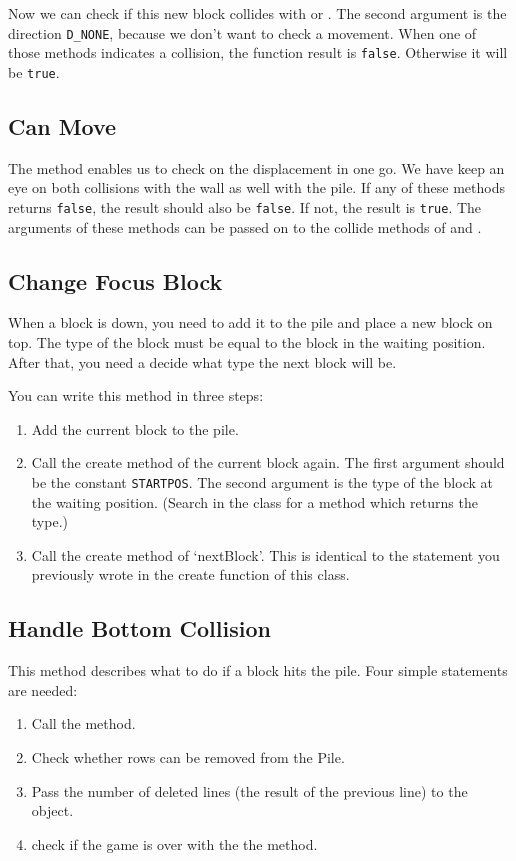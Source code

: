 Now we can check if this new block collides with  or . The second argument is the direction \verb|D_NONE|, because we don't want to check a movement. When one of those methods indicates a collision, the function result is \verb|false|. Otherwise it will be \verb|true|.

\subsection{Can Move}
The  method enables us to check on the displacement in one go. We have keep an eye on both collisions with the wall as well with the pile. If any of these methods returns \verb|false|, the result should also be \verb|false|. If not, the result is \verb|true|. The arguments of these methods can be passed on to the collide methods of  and .

\subsection{Change Focus Block}
When a block is down, you need to add it to the pile and place a new block on top. The type of the block must be equal to the block in the waiting position. After that, you need a decide what type the next block will be.

You can write this method in three steps:

\begin{enumerate}
	\item Add the current block to the pile.
	\item Call the create method of the current block again. The first argument should be the constant \verb|STARTPOS|. The second argument is the type of the block at the waiting position. (Search in the class  for a method which returns the type.)
	\item Call the create method of `nextBlock'. This is identical to the statement you previously wrote in the create function of this class.
\end{enumerate}

\subsection{Handle Bottom Collision}
This method describes what to do if a block hits the pile. Four simple statements are needed:

\begin{enumerate}
	\item Call the  method.
	\item Check whether rows can be removed from the Pile.
	\item Pass the number of deleted lines (the result of the previous line) to the  object.
	\item check if the game is over with the the  method.
\end{enumerate}

